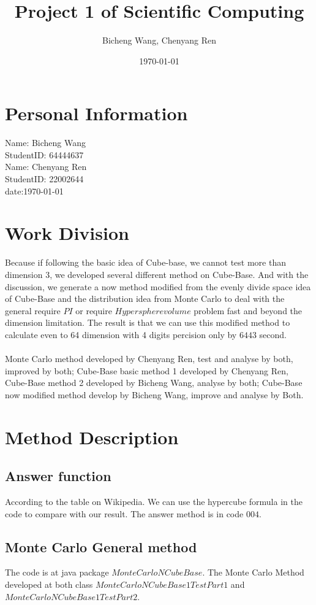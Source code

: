 \documentclass{article}
\title{Project 1 of Scientific Computing}
\author{Bicheng Wang, Chenyang Ren}
\date{\today}
\begin{document}
	\section*{Personal Information}
	Name: Bicheng Wang\\
	StudentID: 64444637\\
	Name: Chenyang Ren\\
	StudentID: 22002644\\
	date:{\today}\\
	\section*{Work Division}
	\label{sec:wd}
		Because if following the basic idea of Cube-base, we cannot test more than dimension 3, we developed several different method on Cube-Base. And with the discussion, we generate a now method modified from the evenly divide space idea of Cube-Base and the distribution idea from Monte Carlo to deal with the general require $PI$ or require $Hyper sphere volume$ problem fast and beyond the dimension limitation. The result is that we can use this modified method to calculate even to 64 dimension with 4 digits percision only by $6443$ second.
		\\
		\\
		Monte Carlo method developed by Chenyang Ren, test and analyse by both, improved by both; Cube-Base basic method 1 developed by Chenyang Ren, Cube-Base method 2 developed by Bicheng Wang, analyse by both; Cube-Base now modified method develop by Bicheng Wang, improve and analyse by Both.
		\\
	\section*{Method Description}
	\label{sec:md}
		\subsection*{Answer function}
		According to the table on Wikipedia. We can use the hypercube formula in the code to compare with our result. The answer method is in code $004$.
		\\
		\subsection*{Monte Carlo General method}
		\label{sub:md}
		The code is at java package $MonteCarloNCubeBase$. The Monte Carlo Method developed at both class $MonteCarloNCubeBase1TestPart1$ and $MonteCarloNCubeBase1TestPart2$.
\end{document}
